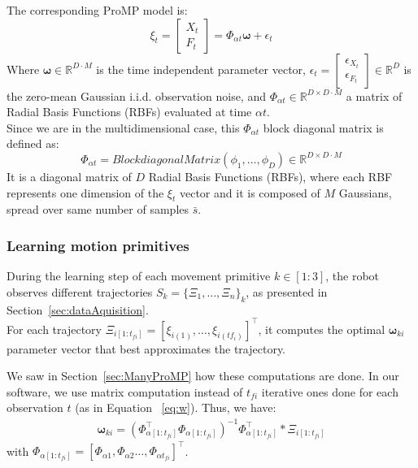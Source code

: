 \documentclass[utf8]{frontiersSCNS} %
\begin{document}
The corresponding ProMP model is:
$$\xi_t = \begin{bmatrix} X_t \\ F_t\end{bmatrix} = \Phi_{\alpha t} \boldsymbol{\omega} + \epsilon_t$$
Where $\boldsymbol{\omega} \in  \mathbb{R}^{D \cdot M}$ is the time independent parameter vector, $\epsilon_t= \begin{bmatrix} \epsilon_{X_t} \\ \epsilon_{F_t}\end{bmatrix} \in \mathbb{R}^D$ is the zero-mean Gaussian i.i.d. observation noise, and $\Phi_{\alpha t} \in \mathbb{R}^{D \times D \cdot M}$ a matrix of Radial Basis Functions (RBFs) evaluated at time $\alpha t$.\\
Since we are in the multidimensional case, this $\Phi_{\alpha t}$ block diagonal matrix is defined as:
$$\Phi_{\alpha t}  = BlockdiagonalMatrix(\phi_1,\ldots,\phi_{D}) \in \mathbb{R}^{D \times D \cdot M} $$
It is a diagonal matrix of $D$ Radial Basis Functions (RBFs), where each RBF represents one dimension of the $\xi_t$ vector and it is composed of $M$ Gaussians, spread over  same number of samples $\bar{s}$.


\subsubsection{Learning motion primitives}
\label{learning}

During the learning step of each movement primitive $k \in [1:3]$, the robot observes different trajectories $S_k = \{\Xi_1,\ldots, \Xi_n\}_k$, as presented in Section~\ref{sec:dataAquisition}.\\
For each trajectory $\Xi_{i {[1:t_{fi}]}} = [\xi_{i(1)}, \ldots, \xi_{i(tf_i)}]^\top$, it computes the optimal $\boldsymbol{\omega}_{ki}$ parameter vector that best approximates the trajectory.

We saw in Section~\ref{sec:ManyProMP} how these computations are done. In our software, we use matrix computation instead of $t_{fi}$ iterative ones done for each observation $t$ (as in Equation ~\ref{eq:w}). Thus, we have:
\begin{eqnarray}
\boldsymbol{\omega}_{ki} = (\Phi_{\alpha [1:t_{fi}]}^\top \Phi_{\alpha [1:t_{fi}]})^{-1} \Phi_{\alpha [1:t_{fi}]}^\top * \Xi_{i {[1:t_{fi}]}}
\end{eqnarray}
with $\Phi_{\alpha [1:t_{fi}]} = [\Phi_{\alpha 1}, \Phi_{\alpha 2}\ldots,\Phi_{\alpha t_{fi}}]^\top$.
\end{document}
